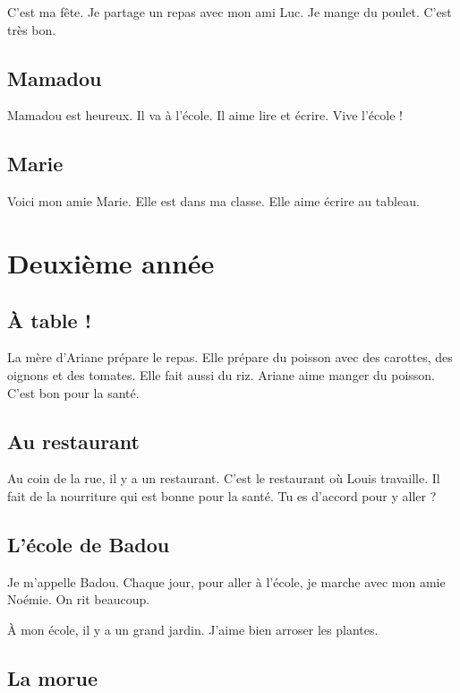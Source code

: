 \documentclass[11pt, french]{article}
\begin{document}
C'est ma fête. Je partage un repas avec mon ami Luc. Je mange du
poulet. C'est très bon.

\subsection{Mamadou}

Mamadou est heureux. Il va à l'école. Il aime lire et écrire. Vive
l'école !

\subsection{Marie}

Voici mon amie Marie. Elle est dans ma classe. Elle aime écrire au
tableau.

\vfill



\section{Deuxième année}

\subsection{À table !}

La mère d'Ariane prépare le repas. Elle prépare du poisson avec des
carottes, des oignons et des tomates. Elle fait aussi du riz. Ariane
aime manger du poisson. C'est bon pour la santé.

\subsection{Au restaurant}

Au coin de la rue, il y a un restaurant. C'est le restaurant où Louis
travaille. Il fait de la nourriture qui est bonne pour la santé. Tu es
d'accord pour y aller ?

\subsection{L'école de Badou}

Je m'appelle Badou. Chaque jour, pour aller à l'école, je marche avec
mon amie Noémie. On rit beaucoup.

À mon école, il y a un grand jardin. J'aime bien arroser les plantes.

\subsection{La morue}
\end{document}
